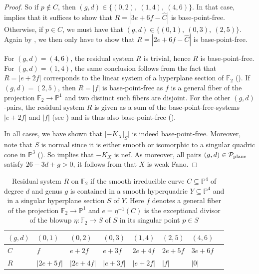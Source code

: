\documentclass[english,11pt,reqno]{amsart}
\newcommand{\sub}{\subseteq}
\newcommand{\Pone}{\mathbb{P}^1}
\newcommand{\Pthree}{\mathbb{P}^3}
\newcommand{\Pfour}{\mathbb{P}^4}
\newcommand{\Ftwo}{\mathbb{F}_2}
\begin{document}
\begin{proof}
So if $p\not \in C$, then $(g,d)\in\{(0,2),\:(1,4),\:(4,6)\}$. In that case,  implies that it suffices to show that $R=|3e+6f-\hat{C}|$ is base-point-free. Otherwise, if $p\in C$, we must have that $(g,d)\in \{(0,1),\:(0,3),\:(2,5)\}$. Again by  , we then only have to show that $R=|2e+6f-\hat{C}|$ is base-point-free.\par
For $(g,d)=(4,6)$, the residual system $R$ is trivial, hence $R$ is base-point-free. For $(g,d)=(1,4)$, the same conclusion follows from the fact that $R=|e+2f|$ corresponds to the linear system of a hyperplane section of $\Ftwo$ (). If $(g,d)=(2,5)$, then $R=|f|$ is base-point-free as $f$ is a general fiber of the projection $\Ftwo \rightarrow \Pone$ and two distinct such fibers are disjoint. For the other $(g,d)$-pairs, the residual system $R$ is given as a sum of the base-point-free-systems $|e+2f|$ and $|f|$ (see ) and is thus also base-point-free (). \par
In all cases, we have shown that $|-K_X|_{\widetilde{S}}|$ is indeed base-point-free. Moreover, note that $S$ is normal since it is either smooth or isomorphic to a singular quadric cone in $\Pthree$ (). So  implies that $-K_X$ is nef. As moreover, all pairs $(g,d)\in\mathcal{P}_{\textup{plane}}$ satisfy $ 26-3d+g>0$, it follows from  that $X$ is weak Fano.
\end{proof}
%
\vspace{-0.5cm}
%
\begin{table}[H] 
\caption{Residual system $R$ on $\Ftwo$ if the smooth irreducible curve $C\sub \Pfour$ of degree $d$ and genus $g$ is contained in a smooth hyperquadric $Y\sub \Pfour$ and in a singular hyperplane section $S$ of $Y$. Here $f$ denotes a general fiber of the projection $\Ftwo \rightarrow \Pone$ and $e=\eta^{-1}(C)$ is the exceptional divisor of the blowup $\eta:\Ftwo\rightarrow S$ of $S$ in its singular point $p\in S$} \label{table:residual_system_curves_in_quadric_cone}
\begin{minipage}{\textwidth}
\centering
\vspace{6pt}
\begin{tabular}{|l|l|l|l|l|l|l|l|}
\hline
$(g,d)$ & $(0,1)$ & $(0,2)$ & $(0,3)$ & $(1,4)$ & $(2,5)$ & $(4,6)$ \\
\hline
$\hat{C}$ & $f$ & $e+2f$ & $e+3f$ & $2e+4f$ & $2e+5f$ & $3e+6f$ \\
\hline
$R$ & $|2e+5f|$ & $|2e+4f|$ & $|e+3f|$ & $|e+2f|$ & $|f|$ & $|0|$\\
\hline
\end{tabular}
\vspace{6pt}
\end{minipage}
\end{table}
\end{document}
